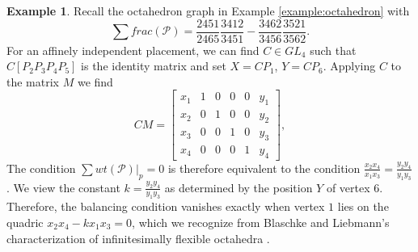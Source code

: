 \documentclass[11pt,letterpaper]{amsart}
\theoremstyle{definition}
\newtheorem{example}{Example}
\begin{document}
\begin{example}\label{example:octahedron-quadric}
Recall the octahedron graph in Example \ref{example:octahedron} with 
\begin{equation*}
    \sum frac(\mathcal{P}) = \frac{2451}{2465} \frac{3412}{3451} - \frac{3462}{3456} \frac{3521}{3562}.
\end{equation*} 
For an affinely independent placement, we can find $C \in GL_4$ such that $C[P_2 P_3 P_4 P_5]$ is the identity matrix and set $X=CP_1$, $Y=C P_6$. Applying $C$ to the matrix $M$ we find
\begin{equation*}
    CM = \begin{bmatrix}
        x_1 & 1 & 0 & 0 & 0 & y_1 \\
        x_2 & 0 & 1 & 0 & 0 & y_2 \\
        x_3 & 0 & 0 & 1 & 0 & y_3 \\
        x_4 & 0 & 0 & 0 & 1 & y_4
    \end{bmatrix},
\end{equation*}
The condition $\sum wt(\mathcal{P})|_p = 0$ is therefore equivalent to the condition $\frac{x_2 x_4}{x_1 x_3} = \frac{y_2 y_4}{y_1 y_3}$. We view the constant $k = \frac{y_2 y_4}{y_1 y_3}$ as determined by the position $Y$ of vertex $6$. Therefore, the balancing condition vanishes exactly when vertex $1$ lies on the quadric $x_2 x_4 - kx_1 x_3 = 0$, which we recognize from Blaschke and Liebmann's characterization of infinitesimally flexible octahedra \cite{Blaschke1920, Liebmann1920}.

\end{example}
\end{document}

